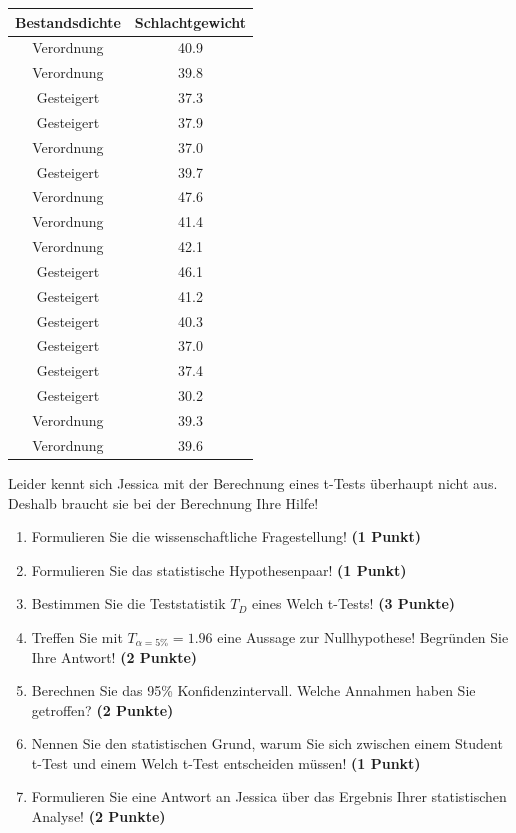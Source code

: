 \documentclass[a4paper, 9pt]{scrartcl}\usepackage[]{graphicx}\usepackage[]{xcolor}
\begin{document}
\begin{table}[!h]
\centering
\begin{tabular}{cc}
\toprule
Bestandsdichte & Schlachtgewicht\\
\midrule
Verordnung & 40.9\\
Verordnung & 39.8\\
Gesteigert & 37.3\\
Gesteigert & 37.9\\
Verordnung & 37.0\\
\addlinespace
Gesteigert & 39.7\\
Verordnung & 47.6\\
Verordnung & 41.4\\
Verordnung & 42.1\\
Gesteigert & 46.1\\
\addlinespace
Gesteigert & 41.2\\
Gesteigert & 40.3\\
Gesteigert & 37.0\\
Gesteigert & 37.4\\
Gesteigert & 30.2\\
\addlinespace
Verordnung & 39.3\\
Verordnung & 39.6\\
\bottomrule
\end{tabular}
\end{table}



Leider kennt sich Jessica mit der Berechnung eines t-Tests überhaupt nicht aus. Deshalb braucht sie bei der Berechnung Ihre Hilfe!

\begin{enumerate}
  \item Formulieren Sie die wissenschaftliche Fragestellung! \textbf{(1 Punkt)}
  \item Formulieren Sie das statistische Hypothesenpaar! \textbf{(1 Punkt)}
  \item Bestimmen Sie die Teststatistik $T_{D}$ eines  Welch t-Tests! \textbf{(3 Punkte)}
  \item Treffen Sie mit $T_{\alpha = 5\%} = 1.96$ eine Aussage zur Nullhypothese! Begründen Sie Ihre Antwort! \textbf{(2 Punkte)}
\item Berechnen Sie das 95\% Konfidenzintervall. Welche Annahmen haben Sie getroffen? \textbf{(2 Punkte)}
\item Nennen Sie den statistischen Grund, warum Sie sich zwischen einem Student t-Test und einem Welch t-Test entscheiden müssen! \textbf{(1 Punkt)}
\item Formulieren Sie eine Antwort an Jessica über das Ergebnis Ihrer statistischen Analyse! \textbf{(2 Punkte)}
\end{enumerate} 
\clearpage
\end{document}
